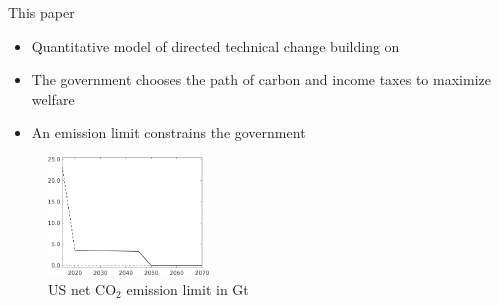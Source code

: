 \documentclass[11pt,aspectratio=169]{beamer}
\begin{document}
\begin{frame}{This paper}
	\vspace{-2mm}
	\begin{itemize}
		\item<+-> Quantitative model of \alert{directed technical change}  building on \cite{Fried2018ClimateAnalysis}
		\vspace{2mm}
		\item<+->   The government   chooses the \alert{path of carbon and income taxes} to maximize welfare\vspace{2mm}
		\item<+-> An \alert{emission limit} constrains the government
	\end{itemize}
	\pause
	\begin{center}
		\begin{figure}
			\centering
			\caption{US net CO$_2$ emission limit in Gt}
			\includegraphics[width=0.38\textwidth]{../codding_model/own_basedOnFried/optimalPol_010922_revision/figures/all_13Sept22_Tplus30/Emnet.png}
		\end{figure}
	\end{center}
\end{frame}
\end{document}

